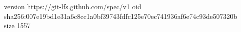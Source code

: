 version https://git-lfs.github.com/spec/v1
oid sha256:007e19bd1e31a6c8cc1a0bf39743fdfc125e70ec741936af6e74c93de507320b
size 1557
